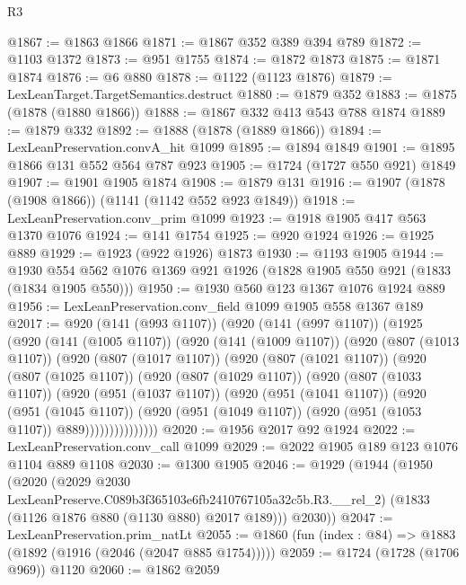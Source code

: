 \begin{lexlean}{R3}
\begin{coremodule}
@1867 := @1863 @1866
@1871 := @1867 @352 @389 @394 @789
@1872 := @1103 @1372
@1873 := @951 @1755
@1874 := @1872 @1873
@1875 := @1871 @1874
@1876 := @6 @880
@1878 := @1122 (@1123 @1876)
@1879 := LexLeanTarget.TargetSemantics.destruct
@1880 := @1879 @352
@1883 := @1875 (@1878 (@1880 @1866))
@1888 := @1867 @332 @413 @543 @788 @1874
@1889 := @1879 @332
@1892 := @1888 (@1878 (@1889 @1866))
@1894 := LexLeanPreservation.convA_hit @1099
@1895 := @1894 @1849
@1901 := @1895 @1866 @131 @552 @564 @787 @923
@1905 := @1724 (@1727 @550 @921) @1849
@1907 := @1901 @1905 @1874
@1908 := @1879 @131
@1916 := @1907 (@1878 (@1908 @1866)) (@1141 (@1142 @552 @923 @1849))
@1918 := LexLeanPreservation.conv_prim @1099
@1923 := @1918 @1905 @417 @563 @1370 @1076
@1924 := @141 @1754
@1925 := @920 @1924
@1926 := @1925 @889
@1929 := @1923 (@922 @1926) @1873
@1930 := @1193 @1905
@1944 := @1930 @554 @562 @1076 @1369 @921 @1926 (@1828 @1905 @550 @921 (@1833 (@1834 @1905 @550)))
@1950 := @1930 @560 @123 @1367 @1076 @1924 @889
@1956 := LexLeanPreservation.conv_field @1099 @1905 @558 @1367 @189
@2017 := @920
    (@141 (@993 @1107))
    (@920
      (@141 (@997 @1107))
      (@1925
        (@920
          (@141 (@1005 @1107))
          (@920
            (@141 (@1009 @1107))
            (@920
              (@807 (@1013 @1107))
              (@920
                (@807 (@1017 @1107))
                (@920
                  (@807 (@1021 @1107))
                  (@920
                    (@807 (@1025 @1107))
                    (@920
                      (@807 (@1029 @1107))
                      (@920
                        (@807 (@1033 @1107))
                        (@920
                          (@951 (@1037 @1107))
                          (@920
                            (@951 (@1041 @1107))
                            (@920
                              (@951 (@1045 @1107))
                              (@920
                                (@951 (@1049 @1107))
                                (@920 (@951 (@1053 @1107)) @889)))))))))))))))
@2020 := @1956 @2017 @92 @1924
@2022 := LexLeanPreservation.conv_call @1099
@2029 := @2022 @1905 @189 @123 @1076 @1104 @889 @1108
@2030 := @1300 @1905
@2046 := @1929
    (@1944
      (@1950
        (@2020
          (@2029 @2030 LexLeanPreserve.C089b3f365103e6fb2410767105a32c5b.R3.__rel_2)
          (@1833 (@1126 @1876 @880 (@1130 @880) @2017 @189)))
        @2030))
@2047 := LexLeanPreservation.prim_natLt
@2055 := @1860 (fun (index : @84) => @1883 (@1892 (@1916 (@2046 (@2047 @885 @1754)))))
@2059 := @1724 (@1728 (@1706 @969)) @1120
@2060 := @1862 @2059

\end{coremodule}
\end{lexlean}
